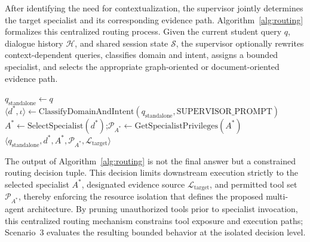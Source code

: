 After identifying the need for contextualization, the supervisor jointly determines the target specialist and its corresponding evidence path. Algorithm~\ref{alg:routing} formalizes this centralized routing process. Given the current student query $q$, dialogue history $\mathcal{H}$, and shared session state $\mathcal{S}$, the supervisor optionally rewrites context-dependent queries, classifies domain and intent, assigns a bounded specialist, and selects the appropriate graph-oriented or document-oriented evidence path.

\begin{algorithm}[!htbp]
\scriptsize
\SetAlFnt{\scriptsize}
\SetAlCapFnt{\scriptsize}
\SetAlCapNameFnt{\scriptsize}
\SetAlgoVlined
\LinesNumbered
\caption{Supervisor Intent and Specialist Routing}
\label{alg:routing}
$q_{\text{standalone}} \leftarrow q$\;
$\langle d^*, \iota \rangle \leftarrow \mathrm{ClassifyDomainAndIntent}(q_{\text{standalone}}, \text{SUPERVISOR\_PROMPT})$\;
$A^* \leftarrow \mathrm{SelectSpecialist}(d^*)$;\quad $\mathcal{P}_{A^*} \leftarrow \mathrm{GetSpecialistPrivileges}(A^*)$\;
\Return $\langle q_{\text{standalone}}, d^*, A^*, \mathcal{P}_{A^*}, \mathcal{L}_{\text{target}} \rangle$\;
\end{algorithm}

The output of Algorithm~\ref{alg:routing} is not the final answer but a constrained routing decision tuple. This decision limits downstream execution strictly to the selected specialist $A^*$, designated evidence source $\mathcal{L}_{\text{target}}$, and permitted tool set $\mathcal{P}_{A^*}$, thereby enforcing the resource isolation that defines the proposed multi-agent architecture. By pruning unauthorized tools prior to specialist invocation, this centralized routing mechanism constrains tool exposure and execution paths; Scenario~3 evaluates the resulting bounded behavior at the isolated decision level.

